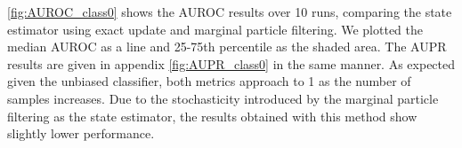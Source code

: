 \autoref{fig:AUROC_class0} shows the AUROC results over 10 runs, comparing the state estimator using exact update and marginal particle filtering. We plotted the median AUROC as a line and 25-75th percentile as the shaded area. The AUPR results are given in appendix \autoref{fig:AUPR_class0} in the same manner. As expected given the unbiased classifier, both metrics approach to 1 as the number of samples increases. Due to the stochasticity introduced by the marginal particle filtering as the state estimator, the results obtained with this method show slightly lower performance. 

